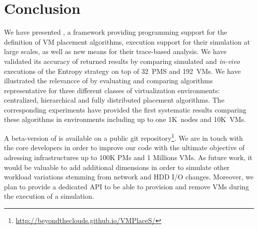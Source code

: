 \section{Conclusion}
\label{sec:conclusion}
We have presented
\vmps, a framework providing programming support for the definition of
VM placement algorithms, execution support for their simulation at
large scales, as well as new means for their trace-based analysis.
We have validated its accuracy of returned results by
comparing simulated and \textit{in-vivo} executions of the Entropy
strategy on top of 32~PMS and 192~VMs. We have illustrated the
relevancce of \vmps by evaluating and comparing algorithms
representative for three different classes of virtualization
environments: centralized, hierarchical and fully distributed
placement algorithms.
The corresponding experiments have provided the first systematic results
comparing these algorithms in environments including up to one
1K~nodes and 10K~VMs.

A beta-version of \vmps is available on a public git
repository\footnote{\url{http://beyondtheclouds.github.io/VMPlaceS/}}.
We are in touch with the \sg core developers in order to improve our
code with the ultimate objective of adressing infrastructures up to
100K PMs and 1 Millions VMs. As future work, it would be valuable to add
additional dimensions in order to simulate other workload variations
stemming from network and HDD I/O changes. Moreover,
we plan to provide a dedicated API to be able to
provision and remove VMs during the execution of a simulation.
